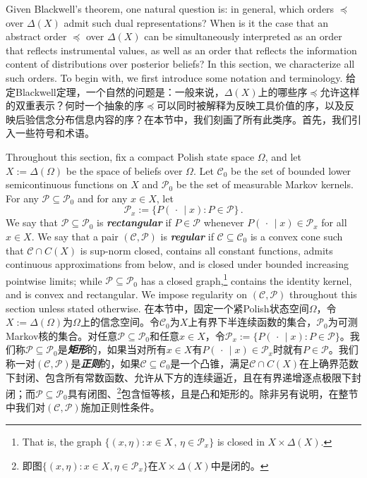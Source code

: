 \documentclass[12pt,letterpaper]{article}
\newenvironment{original}{\color{black}}{}
\newenvironment{translation}{\color{blue}}{}
\theoremstyle{plain}
\theoremstyle{definition}
\theoremstyle{remark}
\newcommand{\Pc}{\mathcal{P}}
\newcommand{\C}{\mathcal{C}}
\theoremstyle{definition}
\begin{document}
\begin{original}
Given Blackwell's theorem, one natural question is: in general, which orders $\preceq$ over $\Delta(X)$ admit such dual representations? When is it the case that an abstract order $\preceq$ over $\Delta(X)$ can be simultaneously interpreted as an order that reflects instrumental values, as well as an order that reflects the information content of distributions over posterior beliefs? In this section, we characterize all such orders. To begin with, we first introduce some notation and terminology.
\end{original}
\begin{translation}
给定Blackwell定理，一个自然的问题是：一般来说，$\Delta(X)$上的哪些序$\preceq$允许这样的双重表示？何时一个抽象的序$\preceq$可以同时被解释为反映工具价值的序，以及反映后验信念分布信息内容的序？在本节中，我们刻画了所有此类序。首先，我们引入一些符号和术语。
\end{translation}

\begin{original}
Throughout this section, fix a compact Polish state space $\Omega$, and let $X := \Delta(\Omega)$ be the space of beliefs over $\Omega$. Let $\C_0$ be the set of bounded lower semicontinuous functions on $X$ and $\Pc_0$ be the set of measurable Markov kernels. For any $\Pc \subseteq \Pc_0$ and for any $x \in X$, let
\[
\Pc_x:=\Big\{P(\,\cdot\,\mid x): P \in \Pc \Big\}\,.
\]
We say that $\Pc \subseteq \Pc_0$ is \textit{\textbf{rectangular}} if $P \in \Pc$ whenever $P(\,\cdot\,\mid x) \in \Pc_x$ for all $x \in X$. We say that a pair $(\C,\Pc)$ is \textit{\textbf{regular}} if $\C \subseteq \C_0$ is a convex cone such that $\C \cap C(X)$ is sup-norm closed, contains all constant functions, admits continuous approximations from below, and is closed under bounded increasing pointwise limits; while $\Pc \subseteq \Pc_0$ has a closed graph,\footnote{That is, the graph $\{(x,\eta): x\in X\,,\, \eta \in \mathcal{P}_x\}$ is closed in $X \times \Delta(X)$.} contains the identity kernel, and is convex and rectangular. We impose regularity on $(\C,\Pc)$ throughout this section unless stated otherwise.
\end{original}
\begin{translation}
在本节中，固定一个紧Polish状态空间$\Omega$，令$X := \Delta(\Omega)$为$\Omega$上的信念空间。令$\C_0$为$X$上有界下半连续函数的集合，$\Pc_0$为可测Markov核的集合。对任意$\Pc \subseteq \Pc_0$和任意$x \in X$，令$\Pc_x:=\{P(\,\cdot\,\mid x): P \in \Pc\}$。我们称$\Pc \subseteq \Pc_0$是\textit{\textbf{矩形}}的，如果当对所有$x \in X$有$P(\,\cdot\,\mid x) \in \Pc_x$时就有$P \in \Pc$。我们称一对$(\C,\Pc)$是\textit{\textbf{正则}}的，如果$\C \subseteq \C_0$是一个凸锥，满足$\C \cap C(X)$在上确界范数下封闭、包含所有常数函数、允许从下方的连续逼近，且在有界递增逐点极限下封闭；而$\Pc \subseteq \Pc_0$具有闭图、\footnote{即图$\{(x,\eta): x\in X, \eta \in \mathcal{P}_x\}$在$X \times \Delta(X)$中是闭的。}包含恒等核，且是凸和矩形的。除非另有说明，在整节中我们对$(\C,\Pc)$施加正则性条件。
\end{translation}
\end{document}
